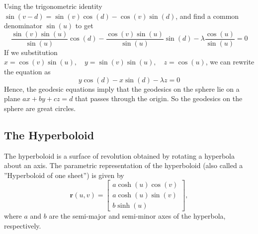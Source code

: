 \documentclass[12pt]{article}
\begin{document}
Using the trigonometric identity \(\sin(v - d) = \sin(v)\cos(d) - \cos(v)\sin(d)\),  and find a common denominator $\sin(u)$ to get
\[
    \frac{\sin(v)\sin(u)}{\sin(u)}\cos(d) - \frac{\cos(v)\sin(u)}{\sin(u)}\sin(d) - \lambda \frac{\cos(u)}{\sin(u)} = 0
\]
If we substitution \(x = \cos(v)\sin(u), \quad y = \sin(v)\sin(u), \quad z = \cos(u)\), we can rewrite the equation as
\[
    y\cos(d) - x\sin(d) - \lambda z = 0
\]
Hence, the geodesic equations imply that the geodesics on the sphere lie on a plane \( ax + by + cz = d \) that passes through the origin.
So the geodesics on the sphere are great circles.

\subsection{The Hyperboloid}

The hyperboloid is a surface of revolution obtained by rotating a hyperbola about an axis.
The parametric representation of the hyperboloid (also called a ”Hyperboloid of one sheet”) is given by
\[
    \mathbf{r}(u, v) = \begin{bmatrix} a \cosh (u) \cos (v) \\ a \cosh (u) \sin (v) \\ b \sinh (u) \end{bmatrix},
\]
where \(a\) and \(b\) are the semi-major and semi-minor axes of the hyperbola, respectively.
\end{document}
